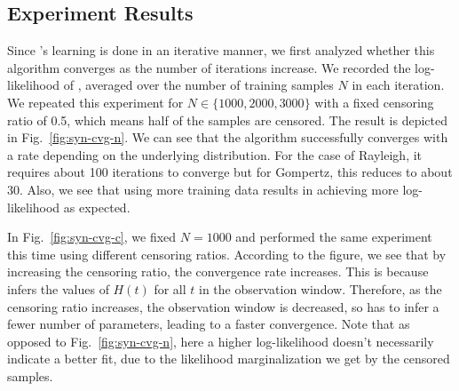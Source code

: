 \subsection{Experiment Results}
Since \npglm's learning is done in an iterative manner, we first analyzed whether this algorithm converges as the number of iterations increase. We recorded the log-likelihood of \npglm, averaged over the number of training samples $N$ in each iteration. We repeated this experiment for $N\in\{1000,2000,3000\}$ with a fixed censoring ratio of 0.5, which means half of the samples are censored. The result is depicted in Fig.~\ref{fig:syn-cvg-n}. We can see that the algorithm successfully converges with a rate depending on the underlying distribution. For the case of Rayleigh, it requires about 100 iterations to converge but for Gompertz, this reduces to about 30. Also, we see that using more training data results in achieving more log-likelihood as expected.



In Fig.~\ref{fig:syn-cvg-c}, we fixed $N=1000$ and performed the same experiment this time using different censoring ratios. According to the figure, we see that by increasing the censoring ratio, the convergence rate increases. This is because \npglm infers the values of $H(t)$ for all $t$ in the observation window. Therefore, as the censoring ratio increases, the observation window is decreased, so \npglm has to infer a fewer number of parameters, leading to a faster convergence. Note that as opposed to Fig.~\ref{fig:syn-cvg-n}, here a higher log-likelihood doesn't necessarily indicate a better fit, due to the likelihood marginalization we get by the censored samples.




